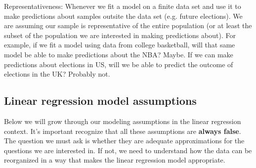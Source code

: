 {\dfn Representativeness}: Whenever we fit a model on a finite data set and use it to make predictions about samples outsite the data set (e.g. future elections). We are assuming our sample is representative of the entire population (or at least the subset of the population we are interested in making predictions about).  For example, if we fit a model using data from college basketball, will that same model be able to make predictions about the NBA? Maybe. If we can make predictions about elections in US, will we be able to predict the outcome of elections in the UK? Probably not. 

\subsection{Linear regression model assumptions}


%


Below we will grow through our modeling assumptions in the linear regression context. It's important recognize that all these assumptions are {\bf always false}. The question we must ask is whether they are adequate approximations for the questions we are interested in. If not, we need to understand how the data can be reorganized in a way that makes the linear regression model appropriate. 





%




